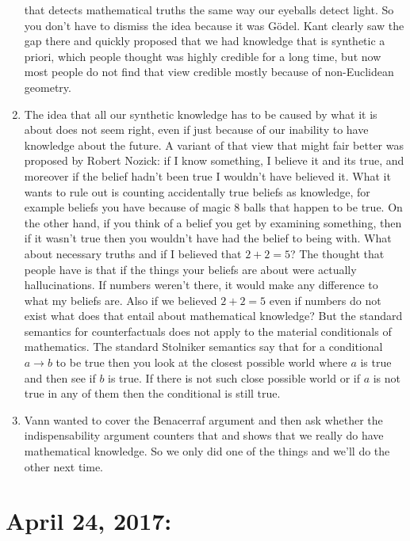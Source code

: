 \documentclass[12pt]{article}
\theoremstyle{definition}
\begin{document}
\begin{enumerate}
        that detects mathematical truths the same way our eyeballs detect
        light. So you don't have to dismiss the idea because it was G\"odel.
        Kant clearly saw the gap there and quickly proposed that we had
        knowledge that is synthetic a priori, which people thought was highly
        credible for a long time, but now most people do not find that view
        credible mostly because of non-Euclidean geometry.
    \item
        The idea that all our synthetic knowledge has to be caused by what it
        is about does not seem right, even if just because of our inability to
        have knowledge about the future. A variant of that view that might fair
        better was proposed by Robert Nozick: if I know something, I believe it
        and its true, and moreover if the belief hadn't been true I wouldn't
        have believed it. What it wants to rule out is counting accidentally
        true beliefs as knowledge, for example beliefs you have because of
        magic 8 balls that happen to be true. On the other hand, if you think
        of a belief you get by examining something, then if it wasn't true then
        you wouldn't have had the belief to being with. What about necessary
        truths and if I believed that $2 + 2 = 5$? The thought that people have
        is that if the things your beliefs are about were actually
        hallucinations. If numbers weren't there, it would make any difference
        to what my beliefs are. Also if we believed $2 + 2 = 5$ even if numbers
        do not exist what does that entail about mathematical knowledge? But
        the standard semantics for counterfactuals does not apply to the
        material conditionals of mathematics. The standard Stolniker semantics
        say that for a conditional $a \rightarrow b$ to be  true then you look
        at the closest possible world where $a$ is true and then see if $b$ is
        true. If there is not such close possible world or if $a$ is not true
        in any of them then the conditional is still true.
    \item
        Vann wanted to cover the Benacerraf argument and then ask whether the
        indispensability argument counters that and shows that we really do
        have mathematical knowledge. So we only did one of the things and we'll
        do the other next time.
\end{enumerate}

\section{April 24, 2017: }
\end{document}
